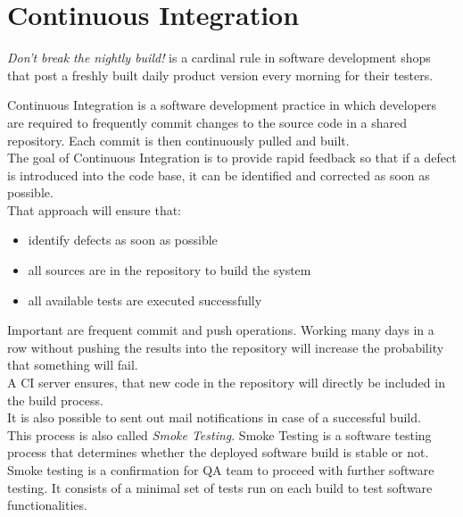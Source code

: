 \section{Continuous Integration}
\emph{Don’t break the nightly build!}
is a cardinal rule in software development shops that post a
freshly built daily product version every morning for their testers.

\vspace{3mm}

Continuous Integration is a software development practice in which
developers are required to frequently commit changes to the
source code in a shared repository. Each commit is then continuously
pulled and built.\\
The goal of Continuous Integration is to provide rapid feedback so that if
a defect is introduced into the code base, it can be identified and
corrected as soon as possible.\\
That approach will ensure that:


\begin{itemize}
\item identify defects as soon as possible
\item all sources are in the repository to build the system
\item all available tests are executed successfully
\end{itemize}

Important are frequent commit and push operations. Working
many days in a row without pushing the results into the repository will
increase the probability that something will fail.\\
A CI server ensures, that new code in the repository will
directly be included in the build process.\\
It is also possible to sent out mail notifications in case of
a successful build.\\
This process is also called \emph{Smoke Testing}.
Smoke Testing is a software testing process that determines whether
the deployed software build is stable or not. Smoke testing is a
confirmation for QA team to proceed with further software testing.
It consists of a minimal set of tests run on each build to test
software functionalities.

